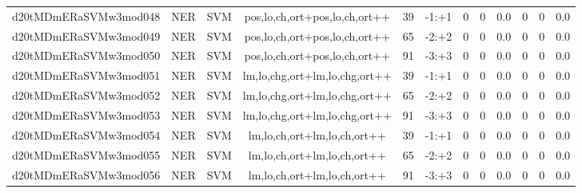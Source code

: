\documentclass[a4paper]{article}
\begin{document}
\begin{landscape}
\begin{center}
\begin{tabular}{ |c|c|c|c|c|c|c|c|c|c|c|c|}
 
 	
 	\small{ d20tMDmERaSVMw3mod048 } & \small{ NER} & \small{  SVM }  & pos,lo,ch,ort+pos,lo,ch,ort++  &  39 &  \small{  -1:+1 }  &  0 & 0 & 0.0  &  0 & 0 & 0.0 \\
 	

 
 	
 	\small{ d20tMDmERaSVMw3mod049 } & \small{ NER} & \small{  SVM }  & pos,lo,ch,ort+pos,lo,ch,ort++  &  65 &  \small{  -2:+2 }  &  0 & 0 & 0.0  &  0 & 0 & 0.0 \\
 	

 
 	
 	\small{ d20tMDmERaSVMw3mod050 } & \small{ NER} & \small{  SVM }  & pos,lo,ch,ort+pos,lo,ch,ort++  &  91 &  \small{  -3:+3 }  &  0 & 0 & 0.0  &  0 & 0 & 0.0 \\
 	

 
 	
 	\small{ d20tMDmERaSVMw3mod051 } & \small{ NER} & \small{  SVM }  & lm,lo,chg,ort+lm,lo,chg,ort++  &  39 &  \small{  -1:+1 }  &  0 & 0 & 0.0  &  0 & 0 & 0.0 \\
 	

 
 	
 	\small{ d20tMDmERaSVMw3mod052 } & \small{ NER} & \small{  SVM }  & lm,lo,chg,ort+lm,lo,chg,ort++  &  65 &  \small{  -2:+2 }  &  0 & 0 & 0.0  &  0 & 0 & 0.0 \\
 	

 
 	
 	\small{ d20tMDmERaSVMw3mod053 } & \small{ NER} & \small{  SVM }  & lm,lo,chg,ort+lm,lo,chg,ort++  &  91 &  \small{  -3:+3 }  &  0 & 0 & 0.0  &  0 & 0 & 0.0 \\
 	

 
 	
 	\small{ d20tMDmERaSVMw3mod054 } & \small{ NER} & \small{  SVM }  & lm,lo,ch,ort+lm,lo,ch,ort++  &  39 &  \small{  -1:+1 }  &  0 & 0 & 0.0  &  0 & 0 & 0.0 \\
 	

 
 	
 	\small{ d20tMDmERaSVMw3mod055 } & \small{ NER} & \small{  SVM }  & lm,lo,ch,ort+lm,lo,ch,ort++  &  65 &  \small{  -2:+2 }  &  0 & 0 & 0.0  &  0 & 0 & 0.0 \\
 	

 
 	
 	\small{ d20tMDmERaSVMw3mod056 } & \small{ NER} & \small{  SVM }  & lm,lo,ch,ort+lm,lo,ch,ort++  &  91 &  \small{  -3:+3 }  &  0 & 0 & 0.0  &  0 & 0 & 0.0 \\
 	


\end{tabular}
\end{center}
\end{landscape}
\end{document}
